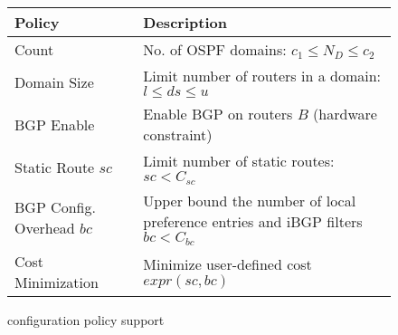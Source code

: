 \begin{figure}
\vspace{-2mm}
\small
\begin{minipage}{\linewidth}
	\begin{tabular}{m{7.4em}  m{15.6em} } 
			{\bf Policy} & {\bf Description} \\ 
			\hline
			Count  & No. of OSPF domains: $c_1\leq N_D\leq c_2$  \\ \hline
			Domain Size  & Limit number of routers in a domain: $l\leq ds\leq u$ \\ \hline
			BGP Enable & Enable BGP on routers $B$ (hardware constraint) \\ \hline
			Static Route ${sc}$ & Limit number of static routes: $sc < C_{sc}$ \\ \hline
			BGP Config. Overhead $bc$ & Upper bound the number of local preference entries and iBGP filters $bc < C_{bc}$ \\ \hline
			Cost Minimization & Minimize user-defined cost $expr(sc, bc)$
		\end{tabular}
				
	\end{minipage}
\caption{\name configuration policy support} 
\label{tab:configpolicysupport}
\end{figure}